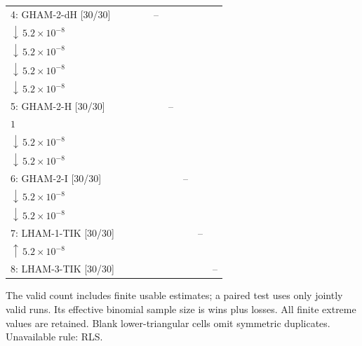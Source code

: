 \begin{table}[!htbp]
{\begin{tabular}{@{}l*{8}{c}@{}}
4: GHAM-2-dH [30/30] &  &  &  & -- & \shortstack{$0{:}30{:}0$\\$\downarrow\,5.2\!\times\!10^{-8}$} & \shortstack{$0{:}30{:}0$\\$\downarrow\,5.2\!\times\!10^{-8}$} & \shortstack{$0{:}30{:}0$\\$\downarrow\,5.2\!\times\!10^{-8}$} & \shortstack{$0{:}30{:}0$\\$\downarrow\,5.2\!\times\!10^{-8}$} \\
5: GHAM-2-H [30/30] &  &  &  &  & -- & \shortstack{$18{:}12{:}0$\\$1$} & \shortstack{$0{:}30{:}0$\\$\downarrow\,5.2\!\times\!10^{-8}$} & \shortstack{$0{:}30{:}0$\\$\downarrow\,5.2\!\times\!10^{-8}$} \\
6: GHAM-2-I [30/30] &  &  &  &  &  & -- & \shortstack{$0{:}30{:}0$\\$\downarrow\,5.2\!\times\!10^{-8}$} & \shortstack{$0{:}30{:}0$\\$\downarrow\,5.2\!\times\!10^{-8}$} \\
7: LHAM-1-TIK [30/30] &  &  &  &  &  &  & -- & \shortstack{$30{:}0{:}0$\\$\uparrow\,5.2\!\times\!10^{-8}$} \\
8: LHAM-3-TIK [30/30] &  &  &  &  &  &  &  & -- \\
\bottomrule
\end{tabular}%
}
\endgroup
\par\smallskip
\begin{minipage}{\linewidth}\footnotesize
The valid count includes finite usable estimates; a paired test uses only jointly valid runs. Its effective binomial sample size is wins plus losses. All finite extreme values are retained. Blank lower-triangular cells omit symmetric duplicates.
Unavailable rule: RLS.
\end{minipage}
\end{table}

